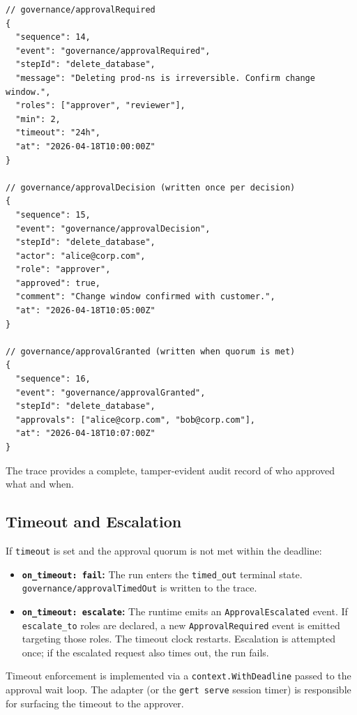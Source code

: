 \begin{verbatim}
// governance/approvalRequired
{
  "sequence": 14,
  "event": "governance/approvalRequired",
  "stepId": "delete_database",
  "message": "Deleting prod-ns is irreversible. Confirm change window.",
  "roles": ["approver", "reviewer"],
  "min": 2,
  "timeout": "24h",
  "at": "2026-04-18T10:00:00Z"
}

// governance/approvalDecision (written once per decision)
{
  "sequence": 15,
  "event": "governance/approvalDecision",
  "stepId": "delete_database",
  "actor": "alice@corp.com",
  "role": "approver",
  "approved": true,
  "comment": "Change window confirmed with customer.",
  "at": "2026-04-18T10:05:00Z"
}

// governance/approvalGranted (written when quorum is met)
{
  "sequence": 16,
  "event": "governance/approvalGranted",
  "stepId": "delete_database",
  "approvals": ["alice@corp.com", "bob@corp.com"],
  "at": "2026-04-18T10:07:00Z"
}
\end{verbatim}

The trace provides a complete, tamper-evident audit record of who approved what and when.

\subsection{Timeout and Escalation}

If \texttt{timeout} is set and the approval quorum is not met within the deadline:
\begin{itemize}
  \item \textbf{\texttt{on\_timeout: fail}:} The run enters the \texttt{timed\_out} terminal state.
        \texttt{governance/approvalTimedOut} is written to the trace.
  \item \textbf{\texttt{on\_timeout: escalate}:} The runtime emits an \texttt{ApprovalEscalated}
        event. If \texttt{escalate\_to} roles are declared, a new \texttt{ApprovalRequired} event
        is emitted targeting those roles. The timeout clock restarts. Escalation is attempted
        once; if the escalated request also times out, the run fails.
\end{itemize}

Timeout enforcement is implemented via a \texttt{context.WithDeadline} passed to the approval
wait loop. The adapter (or the \texttt{gert serve} session timer) is responsible for surfacing
the timeout to the approver.

